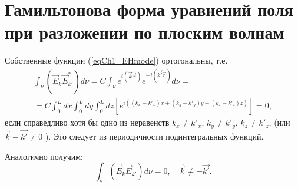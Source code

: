 \section{Гамильтонова форма уравнений поля при разложении по плоским
  волнам}
Собственные функции (\ref{eqCh1_EHmode}) ортогональны, т.е.
\begin{eqnarray}
\int_{\nu} \left( \vec{E}_k \vec{E}_{k'}^{*} \right) d \nu =
C \int_{\nu} e^{i \left(\vec{k}\vec{r}\right)} e^{- i
  \left(\vec{k'}\vec{r}\right)} d \nu =
\nonumber \\
= C \int_0^L d x \int_0^L d y \int_0^L d z
\left[ e^{i\left(
\left(k_x - k'_x\right) x +
\left(k_y - k'_y\right) y +
\left(k_z - k'_z\right) z
\right)}
\right] = 0,
\end{eqnarray}
если справедливо хотя бы одно из неравенств 
$k_x \ne k'_x$,
$k_y \ne k'_y$,
$k_z \ne k'_z$,
(или 
$\vec{k} - \vec{k'} \ne 0$
).  Это следует из периодичности подинтегральных функций. 

Аналогично получим:
\begin{equation}
\int_{\nu} \left( \vec{E}_k \vec{E}_{k'} \right) d \nu = 0,
\quad
\vec{k} \ne - \vec{k'}.
\end{equation}

